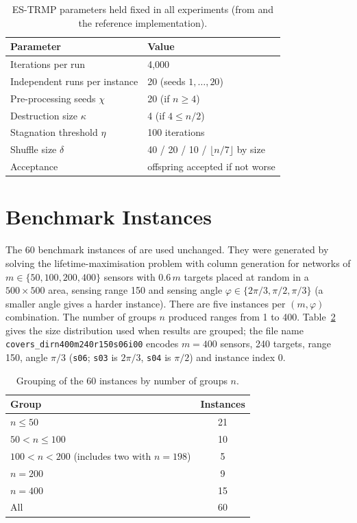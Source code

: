 \begin{table}[htbp]
\centering
\caption{ES-TRMP parameters held fixed in all experiments (from \cite{srivastava2018} and the reference implementation).}
\label{tab:params}
\begin{tabular}{ll}
\toprule
\textbf{Parameter} & \textbf{Value}\\
\midrule
Iterations per run & 4{,}000\\
Independent runs per instance & 20 (seeds $1,\ldots,20$)\\
Pre-processing seeds $\chi$ & 20 (if $n\ge4$)\\
Destruction size $\kappa$ & 4 (if $4\le n/2$)\\
Stagnation threshold $\eta$ & 100 iterations\\
Shuffle size $\delta$ & 40 / 20 / 10 / $\lfloor n/7\rfloor$ by size\\
Acceptance & offspring accepted if not worse\\
\bottomrule
\end{tabular}
\end{table}


\section{Benchmark Instances}\label{sec:instances}

The 60 benchmark instances of \cite{srivastava2018,singh2015} are used unchanged. They were generated by solving the lifetime-maximisation problem with column generation \cite{rossi2013} for networks of $m\in\{50,100,200,400\}$ sensors with $0.6\,m$ targets placed at random in a $500\times500$ area, sensing range 150 and sensing angle $\varphi\in\{2\pi/3,\pi/2,\pi/3\}$ (a smaller angle gives a harder instance). There are five instances per $(m,\varphi)$ combination. The number of groups $n$ produced ranges from 1 to 400. Table~\ref{tab:instances} gives the size distribution used when results are grouped; the file name \texttt{covers\_dirn400m240r150s06i00} encodes $m=400$ sensors, 240 targets, range 150, angle $\pi/3$ (\texttt{s06}; \texttt{s03} is $2\pi/3$, \texttt{s04} is $\pi/2$) and instance index 0.

\begin{table}[htbp]
\centering
\caption{Grouping of the 60 instances by number of groups $n$.}
\label{tab:instances}
\begin{tabular}{lc}
\toprule
\textbf{Group} & \textbf{Instances}\\
\midrule
$n\le50$ & 21\\
$50<n\le100$ & 10\\
$100<n<200$ (includes two with $n=198$) & 5\\
$n=200$ & 9\\
$n=400$ & 15\\
\midrule
All & 60\\
\bottomrule
\end{tabular}
\end{table}

